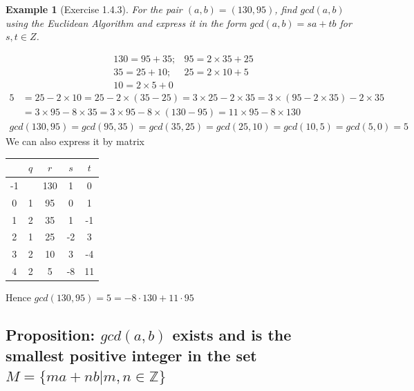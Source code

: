 \documentclass[11pt,a4paper]{article}
\newtheorem{example}{Example}
\begin{document}
\begin{example}[Exercise 1.4.3]
    For the pair $(a,b) = (130, 95)$, find $gcd(a, b)$ using the \textit{Euclidean Algorithm} and express it in the form $gcd(a,b) = sa + tb$ for $s, t \in Z$.
\end{example}
\begin{equation}
    \begin{aligned}
        &130=95+35;
        &95=2\times35+25\\
        &35=25+10;
        &25=2\times10+5\\
        &10=2\times5+0
    \end{aligned}
    \nonumber
\end{equation}
\begin{equation}
    \begin{aligned}
        5&=25-2\times10
        =25-2\times(35-25)
        =3\times25-2\times35=3\times(95-2\times35)-2\times35\\
        &=3\times95-8\times35=3\times95-8\times(130-95)=11\times95-8\times130
    \end{aligned}
    \nonumber
\end{equation}
\begin{equation}
    \begin{aligned}
        gcd(130,95)=gcd(95,35)=gcd(35,25)=gcd(25,10)=gcd(10,5)=gcd(5,0)=5
    \end{aligned}
    \nonumber
\end{equation}
We can also express it by matrix
\begin{center}
    \begin{tabular}{ccccc}
            \hline
            & $q$& $r$&$s$&$t$\\
            \hline
            -1&&130&1&0\\
            0&1&95&0&1\\
            1&2&35&1&-1\\
            2&1&25&-2&3\\
            3&2&10&3&-4\\
            4&2&5&-8&11\\
            \hline
    \end{tabular}
\end{center}
Hence $gcd(130,95)=5=-8\cdot130+11\cdot95$
\subsection{Proposition: $gcd(a,b)$ exists and is the smallest positive integer in the set $M=\{ma+nb|m,n\in\mathbb{Z}\}$}
\end{document}
